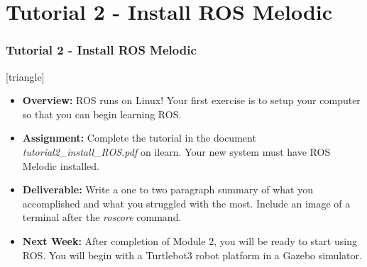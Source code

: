 \documentclass[fleqn]{beamer}                         %
\newcommand{\vspc}{\vspace{2mm}\\}     %
\newcommand{\sectiontitleV}{Tutorial 2 - Install ROS Melodic}
\begin{document}
\section{\sectiontitleV}	
	            \begin{frame}[label=sectionV] \small
		\frametitle{\sectiontitleV}    
	
 [triangle]
                \begin{itemize}

					\item {\bf Overview:} ROS runs on Linux! Your first exercise is to setup your computer so that you can begin learning ROS. 		

					\item {\bf Assignment:} Complete the tutorial in the document {\it tutorial2\_install\_ROS.pdf} on ilearn. Your new system must have ROS Melodic installed.
                    
                    \item {\bf Deliverable:} Write a one to two paragraph summary of what you accomplished and what you struggled with the most. Include an image of a terminal after the {\it roscore} command. 
    
                    \item {\bf Next Week:} After completion of Module 2, you will be ready to start using ROS. You will begin with a Turtlebot3 robot platform in a Gazebo simulator. \vspc
                    
                    
    
                    
                \end{itemize}
		\end{frame}
\end{document}
